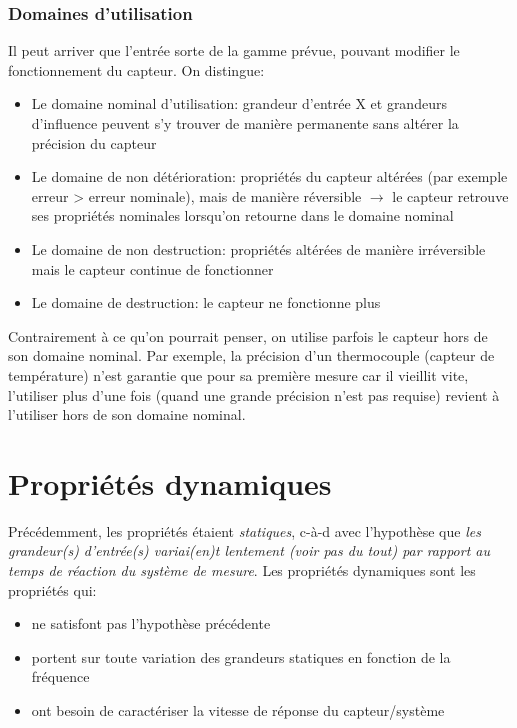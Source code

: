\subsubsection{Domaines d'utilisation}
Il peut arriver que l'entrée sorte de la gamme prévue, pouvant modifier le fonctionnement du capteur. On distingue:
\begin{itemize}
	\item Le domaine nominal d'utilisation: grandeur d'entrée X et grandeurs d'influence peuvent s'y trouver de manière permanente sans altérer la précision du capteur
	\item Le domaine de non détérioration: propriétés du capteur altérées (par exemple erreur > erreur nominale), mais de manière réversible $\rightarrow$ le capteur retrouve ses propriétés nominales lorsqu'on retourne dans le domaine nominal 
	\item Le domaine de non destruction: propriétés altérées de manière irréversible mais le capteur continue de fonctionner 
	\item Le domaine de destruction: le capteur ne fonctionne plus
\end{itemize}
Contrairement à ce qu'on pourrait penser, on utilise parfois le capteur hors de son domaine nominal. Par exemple, la précision d'un thermocouple (capteur de température) n'est garantie que pour sa première mesure car il vieillit vite, l'utiliser plus d'une fois (quand une grande précision n'est pas requise) revient à l'utiliser hors de son domaine nominal.

\section{Propriétés dynamiques}
Précédemment, les propriétés étaient \emph{statiques}, c-à-d avec l'hypothèse que \emph{les grandeur(s) d'entrée(s) variai(en)t lentement (voir pas du tout) par rapport au temps de réaction du système de mesure}. Les propriétés dynamiques sont les propriétés qui:
\begin{itemize}
	\item ne satisfont pas l'hypothèse précédente
	\item portent sur toute variation des grandeurs statiques en fonction de la fréquence
	\item ont besoin de caractériser la vitesse de réponse du capteur/système
\end{itemize}
